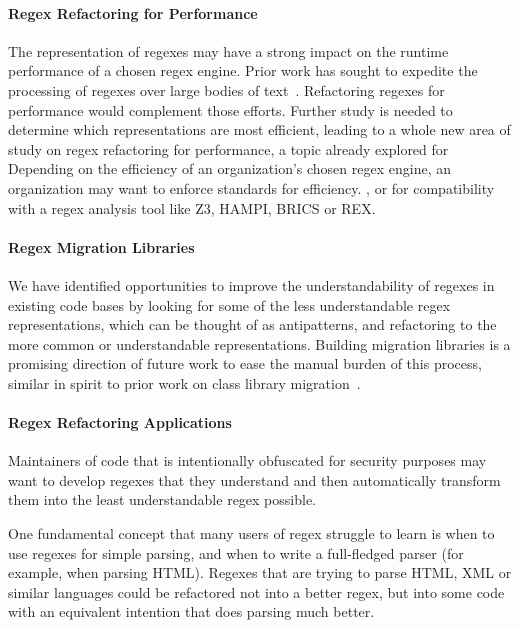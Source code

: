 \paragraph{Regex Refactoring for Performance}
The representation of regexes may have a strong impact on the runtime performance of a chosen regex engine. Prior work has sought to expedite the processing of regexes over large bodies of text~\cite{Baeza-Yates:1996:FTS:235809.235810}.
Refactoring regexes for performance would complement those efforts.
Further study is needed to determine which representations are most efficient, leading to a whole new area of study on regex refactoring for performance, a topic already explored for
Depending on the efficiency of an organization's chosen regex engine, an organization may want to enforce standards for efficiency.
, or for compatibility with a regex analysis tool like Z3, HAMPI, BRICS or REX.

\paragraph{Regex Migration Libraries}
We have identified opportunities
 to improve the understandability of regexes in existing code bases by looking for some of the less understandable regex representations, which can be thought of as antipatterns, and refactoring to the more common or understandable representations.
 Building migration libraries is a promising direction of future work to ease the manual burden of this process, similar in spirit to prior work on class library migration~\cite{Balaban:2005:RSC:1103845.1094832}.

\paragraph{Regex Refactoring Applications}
Maintainers of code that is intentionally obfuscated for security purposes may want to develop regexes that they understand and then automatically transform them into the least understandable regex possible.

One fundamental concept that many users of regex struggle to learn is when to use regexes for simple parsing, and when to write a full-fledged parser (for example, when parsing HTML).  Regexes that are trying to parse HTML, XML or similar languages could be refactored not into a better regex, but into some code with an equivalent intention that does parsing much better.



